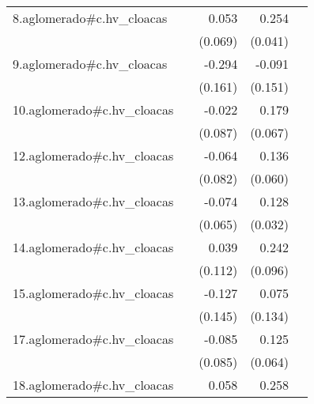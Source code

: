 {\begin{longtable}{l*{4}{D{.}{.}{-1}}}
\addlinespace
8.aglomerado#c.hv\_cloacas&                     &       0.053         &       0.254\sym{***}&                     \\
            &                     &     (0.069)         &     (0.041)         &                     \\
\addlinespace
9.aglomerado#c.hv\_cloacas&                     &      -0.294         &      -0.091         &                     \\
            &                     &     (0.161)         &     (0.151)         &                     \\
\addlinespace
10.aglomerado#c.hv\_cloacas&                     &      -0.022         &       0.179\sym{**} &                     \\
            &                     &     (0.087)         &     (0.067)         &                     \\
\addlinespace
12.aglomerado#c.hv\_cloacas&                     &      -0.064         &       0.136\sym{*}  &                     \\
            &                     &     (0.082)         &     (0.060)         &                     \\
\addlinespace
13.aglomerado#c.hv\_cloacas&                     &      -0.074         &       0.128\sym{***}&                     \\
            &                     &     (0.065)         &     (0.032)         &                     \\
\addlinespace
14.aglomerado#c.hv\_cloacas&                     &       0.039         &       0.242\sym{*}  &                     \\
            &                     &     (0.112)         &     (0.096)         &                     \\
\addlinespace
15.aglomerado#c.hv\_cloacas&                     &      -0.127         &       0.075         &                     \\
            &                     &     (0.145)         &     (0.134)         &                     \\
\addlinespace
17.aglomerado#c.hv\_cloacas&                     &      -0.085         &       0.125         &                     \\
            &                     &     (0.085)         &     (0.064)         &                     \\
\addlinespace
18.aglomerado#c.hv\_cloacas&                     &       0.058         &       0.258\sym{***}&                     \\

\end{longtable}}
